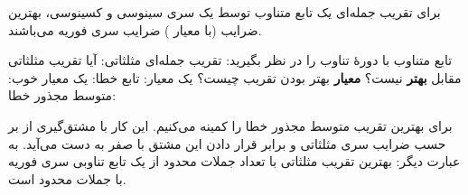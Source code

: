 \EMhold


\begin{EMtheorem}{}

برای تقریب  جمله‌ای یک تابع متناوب  توسط یک سری سینوسی و کسینوسی، بهترین ضرایب (با معیار ) ضرایب سری فوریه می‌باشند.

\end{EMtheorem}

تابع متناوب با دورهٔ تناوب \EMim{2\pi} را در نظر بگیرید:
تقریب  جمله‌ای مثلثاتی:
آیا تقریب مثلثاتی مقابل \textbf{بهتر} نیست؟
\textbf{معیار} بهتر بودن تقریب چیست؟ یک معیار: تابع خطا:
یک معیار خوب: متوسط مجذور خطا:

\begin{EMproof}

برای بهترین تقریب متوسط مجذور خطا را کمینه می‌کنیم. این کار با مشتق‌گیری از  بر حسب ضرایب سری مثلثاتی و برابر قرار دادن این مشتق با صفر به دست می‌آید. به عبارت دیگر:
بهترین تقریب مثلثاتی با تعداد جملات محدود از یک تابع تناوبی سری فوریه با جملات محدود است.

\end{EMproof}

